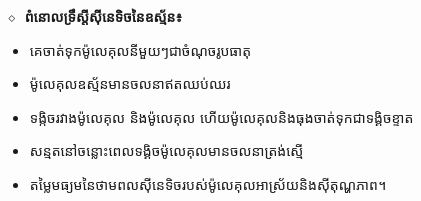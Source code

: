 \sloppy
{}
\tanbgdivider
	
	
	\khmerbody $\diamond$\
\textbf{ពំនោលទ្រឹស្តីសុីនេទិចនៃឧស្ម័ន៖}
	\begin{itemize}[leftmargin=2.5cm, label={\textcolor{brownheader}{\faCaretRight}}]
		\item គេចាត់ទុកម៉ូលេគុលនីមួយៗជាចំណុចរូបធាតុ
		\item ម៉ូលេគុលឧស្ម័នមានចលនាឥតឈប់ឈរ
		\item ទង្កិចរវាងម៉ូលេគុល និងម៉ូលេគុល ហើយម៉ូលេគុលនិងធុងចាត់ទុកជាទង្គិចខ្ទាត
		\item សន្មតនៅចន្លោះពេលទង្គិចម៉ូលេគុលមានចលនាត្រង់ស្មើ
		\item តម្លៃមធ្យមនៃថាមពលសុីនេទិចរបស់ម៉ូលេគុលអាស្រ័យនិងសុីតុណ្ហភាព។
	\end{itemize}
	

	
